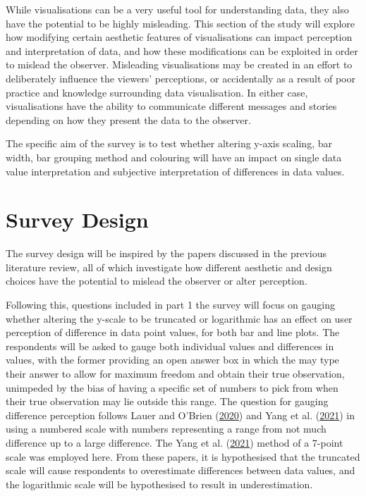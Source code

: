 \documentclass[
  11pt,
]{book}
\begin{document}
While visualisations can be a very useful tool for understanding data,
they also have the potential to be highly misleading. This section of
the study will explore how modifying certain aesthetic features of
visualisations can impact perception and interpretation of data, and how
these modifications can be exploited in order to mislead the observer.
Misleading visualisations may be created in an effort to deliberately
influence the viewers' perceptions, or accidentally as a result of poor
practice and knowledge surrounding data visualisation. In either case,
visualisations have the ability to communicate different messages and
stories depending on how they present the data to the observer.

The specific aim of the survey is to test whether altering y-axis
scaling, bar width, bar grouping method and colouring will have an
impact on single data value interpretation and subjective interpretation
of differences in data values.

\section{Survey Design}

The survey design will be inspired by the papers discussed in the
previous literature review, all of which investigate how different
aesthetic and design choices have the potential to mislead the observer
or alter perception.

Following this, questions included in part 1 the survey will focus on
gauging whether altering the y-scale to be truncated or logarithmic has
an effect on user perception of difference in data point values, for
both bar and line plots. The respondents will be asked to gauge both
individual values and differences in values, with the former providing
an open answer box in which the may type their answer to allow for
maximum freedom and obtain their true observation, unimpeded by the bias
of having a specific set of numbers to pick from when their true
observation may lie outside this range. The question for gauging
difference perception follows Lauer and O'Brien
(\protect\hyperlink{ref-claire-obrian}{2020}) and Yang et al.
(\protect\hyperlink{ref-YANG2021}{2021}) in using a numbered scale with
numbers representing a range from not much difference up to a large
difference. The Yang et al. (\protect\hyperlink{ref-YANG2021}{2021})
method of a 7-point scale was employed here. From these papers, it is
hypothesised that the truncated scale will cause respondents to
overestimate differences between data values, and the logarithmic scale
will be hypothesised to result in underestimation.
\end{document}
